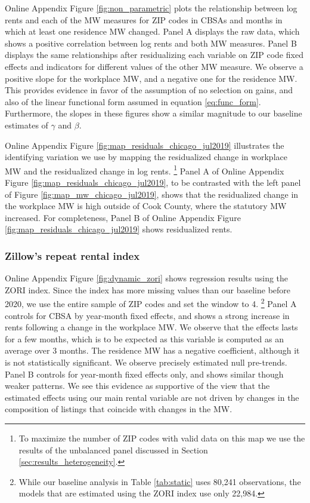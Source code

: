 Online Appendix Figure \ref{fig:non_parametric} plots the relationship between 
log rents and each of the MW measures for ZIP codes in CBSAs and months 
in which at least one residence MW changed.
Panel A displays the raw data, which shows a positive correlation between log 
rents and both MW measures.
Panel B displays the same relationships after residualizing each variable on 
ZIP code fixed effects and indicators for different values of the other MW 
measure.
We observe a positive slope for the workplace MW, and a negative one for
the residence MW.
This provides evidence in favor of the assumption of no selection on gains, and
also of the linear functional form assumed in equation \eqref{eq:func_form}. 
Furthermore, the slopes in these figures show a similar magnitude to our 
baseline estimates of $\gamma$ and $\beta$.

Online Appendix Figure \ref{fig:map_residuals_chicago_jul2019} illustrates the 
identifying variation we use by mapping the residualized change in workplace MW 
and the residualized change in log rents.%
\footnote{To maximize the number of ZIP codes with valid data on this map we
    use the results of the unbalanced panel discussed in Section 
    \ref{sec:results_heterogeneity}.}
Panel A of Online Appendix Figure \ref{fig:map_residuals_chicago_jul2019}, to be 
contrasted with the left panel of Figure \ref{fig:map_mw_chicago_jul2019}, 
shows that the residualized change in the workplace MW is high outside of Cook 
County, where the statutory MW increased.
For completeness, Panel B of Online Appendix Figure 
\ref{fig:map_residuals_chicago_jul2019} shows residualized rents.

\subsubsection{Zillow's repeat rental index}

Online Appendix Figure \ref{fig:dynamic_zori} shows regression results
using the ZORI index.
Since the index has more missing values than our baseline before 2020,
we use the entire sample of ZIP codes and set the window to 4.%
\footnote{While our baseline analysis in Table \ref{tab:static} uses 80,241 
    observations, the models that are estimated using the ZORI index use 
    only 22,984.}
Panel A controls for CBSA by year-month fixed effects, and shows 
a strong increase in rents following a change in the workplace MW.
We observe that the effects lasts for a few months, which is to be expected
as this variable is computed as an average over 3 months.
The residence MW has a negative coefficient, although it is not statistically 
significant.
We observe precisely estimated null pre-trends.
Panel B controls for year-month fixed effects only, and shows similar though 
weaker patterns.
We see this evidence as supportive of the view that the estimated effects
using our main rental variable are not driven by changes in the composition
of listings that coincide with changes in the MW.

